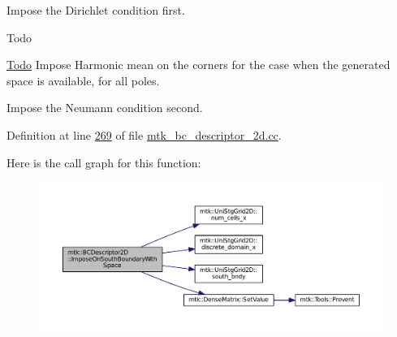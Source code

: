 \begin{DoxyEnumerate}
\item Impose the Dirichlet condition first.
\end{DoxyEnumerate}

\begin{DoxyRefDesc}{Todo}
\item[\hyperlink{todo__todo000013}{Todo}]Impose Harmonic mean on the corners for the case when the generated space is available, for all poles. \end{DoxyRefDesc}



\begin{DoxyEnumerate}
\item Impose the Neumann condition second. 
\end{DoxyEnumerate}

Definition at line \hyperlink{mtk__bc__descriptor__2d_8cc_source_l00269}{269} of file \hyperlink{mtk__bc__descriptor__2d_8cc_source}{mtk\+\_\+bc\+\_\+descriptor\+\_\+2d.\+cc}.



Here is the call graph for this function\+:
\nopagebreak
\begin{figure}[H]
\begin{center}
\leavevmode
\includegraphics[width=350pt]{classmtk_1_1BCDescriptor2D_af30c275cf06176a2ae9722014142c810_cgraph}
\end{center}
\end{figure}


